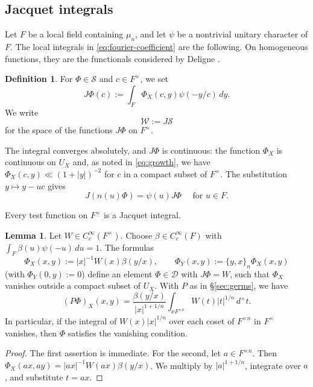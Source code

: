 \documentclass[reqno]{amsart}
\theoremstyle{plain}
\theoremstyle{definition}
\newtheorem{definition}[theorem]{Definition}
\theoremstyle{itplain}
\newtheorem{lemma}[theorem]{Lemma}
\numberwithin{equation}{section}
\numberwithin{theorem}{section}
\begin{document}
\subsection{Jacquet integrals}\label{sec:jacquet}
Let $F$ be a local field containing $\mu_n$, and let $\psi$ be a nontrivial unitary character of $F$.  The local integrals in \eqref{eq:fourier-coefficient} are the following.  On homogeneous functions, they are the functionals considered by Deligne \cite[\S\S6.4--6.5]{SB_1978-1979__21__244_0}.
\begin{definition}
  For $\Phi \in \mathcal{S}$ and $c \in F^\times$, we set
  \begin{equation*}
    J \Phi(c) := \int_F \Phi_X(c, y) \psi(- y / c) \, d y.
  \end{equation*}
  We write
  \begin{equation*}
    \mathcal{W} := J \mathcal{S}
  \end{equation*}
  for the space of the functions $J \Phi$ on $F^\times$.
\end{definition}
The integral converges absolutely, and $J \Phi$ is continuous: the function $\Phi_X$ is continuous on $U_X$ and, as noted in \eqref{eq:growth}, we have $\Phi_X(c, y) \ll (1 + \lvert y \rvert)^{-2}$ for $c$ in a compact subset of $F^\times$.  The substitution $y \mapsto y - u c$ gives
\begin{equation}\label{eq:jacquet-equivariance}
  J(n(u) \Phi) = \psi(u) J \Phi
  \quad \text{ for } u \in F.
\end{equation}

Every test function on $F^\times$ is a Jacquet integral.
\begin{lemma}\label{lemma:jacquet-surjective}
  Let $W \in C_c^\infty(F^\times)$.  Choose $\beta \in C_c^\infty(F)$ with $\int_F \beta(u) \psi(-u) \, d u = 1$.  The formulas
  \begin{equation*}
    \Phi_X(x, y) := \lvert x \rvert^{-1} W(x) \beta(y/x),
    \qquad
    \Phi_Y(x, y) := \{y, x\}_n \Phi_X(x, y)
  \end{equation*}
  (with $\Phi_Y(0, y) := 0$) define an element $\Phi \in \mathcal{D}$ with $J \Phi = W$, such that $\Phi_X$ vanishes outside a compact subset of $U_X$.  With $P$ as in \S\ref{sec:germs}, we have
  \begin{equation}\label{eq:lift-average}
    (P \Phi)_X(x, y) = \frac{\beta(y/x)}{\lvert x \rvert^{1 + 1/n}} \int_{x F^{\times n}} W(t) \lvert t \rvert^{1/n} \, d^\times t.
  \end{equation}
  In particular, if the integral of $W(x) \lvert x \rvert^{1/n}$ over each coset of $F^{\times n}$ in $F^\times$ vanishes, then $\Phi$ satisfies the vanishing condition.
\end{lemma}
\begin{proof}
  The first assertion is immediate.  For the second, let $a \in F^{\times n}$.  Then $\Phi_X(a x, a y) = \lvert a x \rvert^{-1} W(a x) \beta(y / x)$.  We multiply by $\lvert a \rvert^{1 + 1/n}$, integrate over $a$, and substitute $t = a x$.
\end{proof}
\end{document}
